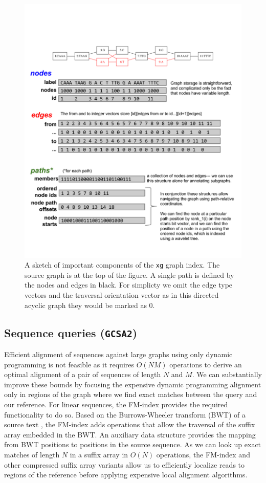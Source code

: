 \documentclass{article}
\begin{document}
\begin{figure}[t]
\centering
\includegraphics[width=1.0\textwidth]{figures/xg}
\caption{\label{fig:xg}
  A sketch of important components of the {\tt xg} graph index.
  The source graph is at the top of the figure.
  A single path is defined by the nodes and edges in black.
  For simplicty we omit the edge type vectors and the traversal orientation vector as in this directed acyclic graph they would be marked as 0.
}
\end{figure}


\subsection{Sequence queries ({\tt GCSA2})}

Efficient alignment of sequences against large graphs using only dynamic programming is not feasible as it requires $O(NM)$ operations to derive an optimal alignment of a pair of sequences of length $N$ and $M$.
We can substantially improve these bounds by focusing the expensive dynamic programming alignment only in regions of the graph where we find exact matches between the query and our reference.
For linear sequences, the FM-index \cite{fmindex2000, fmindex2005} provides the required functionality to do so.
Based on the Burrows-Wheeler transform (BWT) of a source text \cite{burrowswheeler1994}, the FM-index adds operations that allow the traversal of the suffix array embedded in the BWT.
An auxiliary data structure provides the mapping from BWT positions to positions in the source sequence.
As we can look up exact matches of length $N$ in a suffix array in $O(N)$ operations, the FM-index and other compressed suffix array variants allow us to efficiently localize reads to regions of the reference before applying expensive local alignment algorithms.
\end{document}
